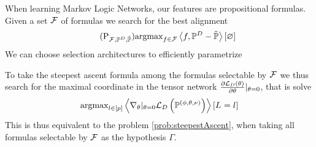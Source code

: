 



When learning Markov Logic Networks, our features are propositional formulas.
Given a set $\mathcal{F}$ of formulas we search for the best alignment 
\begin{align}\label{prob:steepestAscent}\tag{$\mathrm{P}_{\formulaset,\empdistribution,\currentdistribution}$}
	\argmax_{\formula\in\formulaset} \sbcontraction{\formula,\empdistribution-\currentdistribution}
\end{align}
We can choose selection architectures to efficiently parametrize 




%
To take the steepest ascent formula among the formulas selectable by $\mathcal{F}$ we thus search for the maximal coordinate in the tensor network $\frac{\partial \mathcal{L}_{D}\left(\theta\right)}{\partial \theta}|_{\theta=0}$, that is solve
\begin{align}
	\mathrm{argmax}_{l\in[p]} \left\langle  \nabla_{\theta}|_{\theta=0} \mathcal{L}_{D}\left(\mathbb{P}^{(\phi,\theta,\nu)}\right)
	\right\rangle \left[ L_{}=l_{} \right]
\end{align}
This is thus equivalent to the problem \ref{prob:steepestAscent}, when taking all formulas selectable by $\mathcal{F}$ as the hypothesis $\Gamma$.


